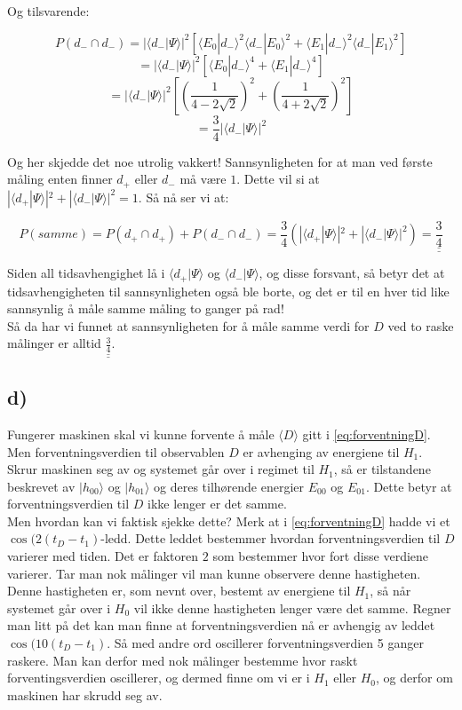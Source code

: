 \documentclass[a4paper,norsk, 10pt]{article}
\numberwithin{equation}{section}
\begin{document}
Og tilsvarende:

$$
P(d_- \cap d_-) = |\langle d_-|\Psi\rangle|^2\left[\langle E_0|d_-\rangle^2\langle d_-|E_0\rangle^2 + \langle E_1|d_-\rangle^2\langle d_-|E_1\rangle^2\right]
$$
$$
= |\langle d_-|\Psi\rangle|^2\left[\langle E_0|d_-\rangle^4 + \langle E_1|d_-\rangle^4\right]
$$
$$
= |\langle d_-|\Psi\rangle|^2\left[ \left(\frac{1}{4-2\sqrt{2}}\right)^2 + \left(\frac{1}{4+2\sqrt{2}}\right)^2\right]
$$
$$
= \frac{3}{4}|\langle d_-|\Psi\rangle|^2
$$

Og her skjedde det noe utrolig vakkert! Sannsynligheten for at man ved første måling enten finner $d_+$ eller $d_-$ må være $1$. Dette vil si at $|\langle d_+|\Psi\rangle|^2 + |\langle d_-|\Psi\rangle|^2 = 1$. Så nå ser vi at:

\begin{equation}
P(samme) = P(d_+ \cap d_+) + P(d_- \cap d_-) = \frac{3}{4}\left(|\langle d_+|\Psi\rangle|^2 + |\langle d_-|\Psi\rangle|^2\right) = \underline{\underline{\frac{3}{4}}}
\end{equation}

Siden all tidsavhengighet lå i $\langle d_+|\Psi\rangle$ og $\langle d_-|\Psi\rangle$, og disse forsvant, så betyr det at tidsavhengigheten til sannsynligheten også ble borte, og det er til en hver tid like sannsynlig å måle samme måling to ganger på rad!\\


Så da har vi funnet at sannsynligheten for å måle samme verdi for $D$ ved to raske målinger er alltid $\underline{\underline{\frac{3}{4}}}$.

\subsection*{d)}

Fungerer maskinen skal vi kunne forvente å måle $\langle D\rangle$ gitt i \eqref{eq:forventningD}. Men forventningsverdien til observablen $D$  er avhenging av energiene til $H_1$. Skrur maskinen seg av og systemet går over i regimet til $H_1$, så er tilstandene beskrevet av $|h_{00}\rangle$ og $|h_{01}\rangle$ og deres tilhørende energier $E_{00}$ og $E_{01}$. Dette betyr at forventningsverdien til $D$ ikke lenger er det samme.\\

Men hvordan kan vi faktisk sjekke dette? Merk at i \eqref{eq:forventningD} hadde vi et $\cos(2(t_D - t_1)$-ledd. Dette leddet bestemmer hvordan forventningsverdien til $D$ varierer med tiden. Det er faktoren $2$ som bestemmer hvor fort disse verdiene varierer. Tar man nok målinger vil man kunne observere denne hastigheten. Denne hastigheten er, som nevnt over, bestemt av energiene til $H_1$, så når systemet går over i $H_0$ vil ikke denne hastigheten lenger være det samme. Regner man litt på det kan man finne at forventningsverdien nå er avhengig av leddet $\cos(10(t_D - t_1)$. Så med andre ord oscillerer forventningsverdien 5 ganger raskere. Man kan derfor med nok målinger bestemme hvor raskt forventingsverdien oscillerer, og dermed finne om vi er i $H_1$ eller $H_0$, og derfor om maskinen har skrudd seg av.
\end{document}
